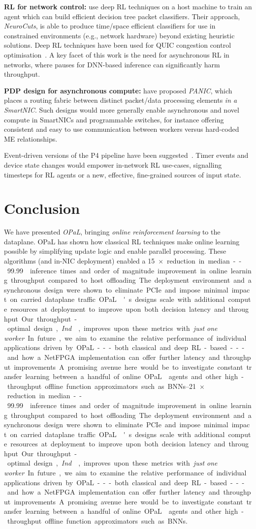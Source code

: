 \documentclass[
sigconf,natbib=false
]{acmart}
\newcommand{\fakepara}[1]{\noindent\textbf{#1:}}
\newcommand{\approachshort}{OPaL}
\newcommand{\Indfw}{\emph{Ind}}
\begin{document}
\fakepara{RL for network control}
\Textcite{DBLP:conf/sigcomm/LiangZJS19} use deep RL techniques on a host machine to train an agent which can build efficient decision tree packet classifiers.
Their approach, \emph{NeuroCuts}, is able to produce time/space efficient classifiers for use in constrained environments (e.g., network hardware) beyond existing heuristic solutions.
Deep RL techniques have been used for QUIC congestion control optimisation~\parencite{DBLP:journals/corr/abs-1910-04054}.
A key facet of this work is the need for asynchronous RL in networks, where pauses for DNN-based inference can significantly harm throughput.

\fakepara{PDP design for asynchronous compute}
\Textcite{DBLP:conf/hotnets/StephensAS18} have proposed \emph{PANIC}, which places a routing fabric between distinct packet/data processing elements \emph{in a SmartNIC}.
Such designs would more generally enable asynchronous and novel compute in SmartNICs and programmable switches, for instance offering consistent and easy to use communication between workers versus hard-coded ME relationships.

Event-driven versions of the P4 pipeline have been suggested~\parencite{DBLP:conf/hotnets/IbanezABM19}.
Timer events and device state changes would empower in-network RL use-cases, signalling timesteps for RL agents or a new, effective, fine-grained sources of input state.

\section{Conclusion}
We have presented \emph{\approachshort{}}, bringing \emph{online reinforcement learning} to the dataplane.
\approachshort{} has shown how classical RL techniques make online learning possible by simplifying update logic and enable parallel processing.
These algorithms (and in-NIC deployment) enabled a \SIrange{15}{21}{$\times$} reduction in median--\num{99.99} inference times and order of magnitude improvement in online learning throughput compared to host offloading.
The deployment environment and asynchronous design were shown to eliminate PCIe and impose minimal impact on carried dataplane traffic.
\approachshort{}'s designs scale with additional compute resources at deployment to improve upon both decision latency and throughput.
Our throughput-optimal design, \Indfw{}, improves upon these metrics with \emph{just one worker}.

In future, we aim to examine the relative performance of individual applications driven by \approachshort---both classical and deep RL-based---and how a NetFPGA implementation can offer further latency and throughput improvements.
A promising avenue here would be to investigate constant transfer learning between a handful of online \approachshort{} agents and other high-throughput offline function approximators such as BNNs.
\end{document}
